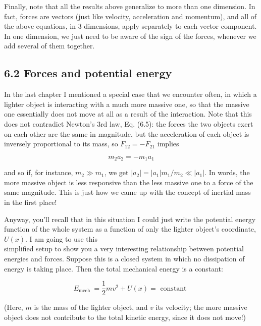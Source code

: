 \documentclass[10pt]{article}
\begin{document}
Finally, note that all the results above generalize to more than one dimension. In fact, forces are vectors (just like velocity, acceleration and momentum), and all of the above equations, in 3 dimensions, apply separately to each vector component. In one dimension, we just need to be aware of the sign of the forces, whenever we add several of them together.

\subsection*{6.2 Forces and potential energy}
In the last chapter I mentioned a special case that we encounter often, in which a lighter object is interacting with a much more massive one, so that the massive one essentially does not move at all as a result of the interaction. Note that this does not contradict Newton's 3rd law, Eq. (6.5): the forces the two objects exert on each other are the same in magnitude, but the acceleration of each object is inversely proportional to its mass, so $F_{12}=-F_{21}$ implies


\begin{equation*}
m_{2} a_{2}=-m_{1} a_{1} \tag{6.12}
\end{equation*}


and so if, for instance, $m_{2} \gg m_{1}$, we get $\left|a_{2}\right|=\left|a_{1}\right| m_{1} / m_{2} \ll\left|a_{1}\right|$. In words, the more massive object is less responsive than the less massive one to a force of the same magnitude. This is just how we came up with the concept of inertial mass in the first place!

Anyway, you'll recall that in this situation I could just write the potential energy function of the whole system as a function of only the lighter object's coordinate, $U(x)$. I am going to use this\\
simplified setup to show you a very interesting relationship between potential energies and forces. Suppose this is a closed system in which no dissipation of energy is taking place. Then the total mechanical energy is a constant:


\begin{equation*}
E_{\text {mech }}=\frac{1}{2} m v^{2}+U(x)=\text { constant } \tag{6.13}
\end{equation*}


(Here, $m$ is the mass of the lighter object, and $v$ its velocity; the more massive object does not contribute to the total kinetic energy, since it does not move!)
\end{document}
